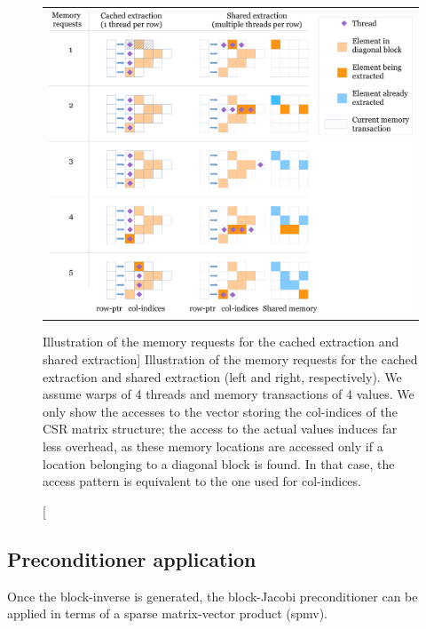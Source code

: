 \begin{figure}[t]
\begin{center}
\begin{tabular}{r}
\includegraphics[width=.85\columnwidth]{plots/shared_extraction_legend}
\end{tabular}
\end{center}
\caption
[Illustration of the memory requests for the cached extraction and shared
extraction]
{Illustration of the memory requests for the cached extraction and shared extraction (left and right, respectively).
We assume warps of 4 threads and memory transactions of 4 values.
We only show the accesses to the vector storing the {\sf col-indices} of the CSR matrix structure; 
the access to the actual values induces far less overhead,
as these memory locations are accessed only if a location belonging to a diagonal block is found.
In that case, the access pattern is equivalent to the one used for {\sf col-indices}.
}
\label{2017-gje-block-jacobi:fig:memtransact}
\end{figure}

\subsection{Preconditioner application}
\label{2017-gje-block-jacobi:sec:precapply}
Once the block-inverse is generated,
the block-Jacobi preconditioner can be applied in terms 
of a sparse matrix-vector product
({\sc spmv}).

